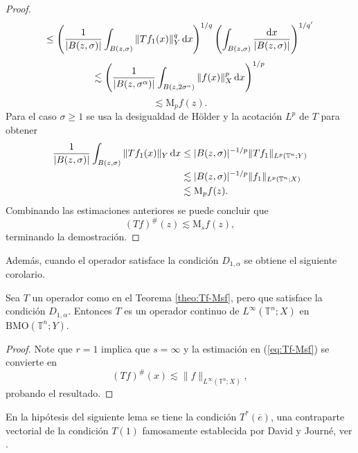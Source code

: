 \begin{proof}
\begin{equation*}
		\leq \left( 
		\frac{1}{|B(z,\sigma)|}\int_{B(z,\sigma)} \|Tf_1(x)\|^q_Y \mathop{}\!\mathrm{d} x 
		\right)^{1/q} \left( \int_{B(z,\sigma)} \frac{\mathop{}\!\mathrm{d} x}{|B(z,\sigma)|}  
		\right)^{1/q'}
	\end{equation*}
	\begin{equation*}
		\lesssim \left( \frac{1}{|B(z, \sigma^\alpha)|} \int_{B(z,2\sigma^\alpha)} \|f(x)\|_X^p \mathop{}\!\mathrm{d} x  \right)^{1/p} 
	\end{equation*}
	\begin{equation*}
		\lesssim \mathrm{M}_pf(z).
	\end{equation*}
	Para el caso $\sigma \geq 1$ se usa la desigualdad de H\"older y la acotación $L^p$ de $T$ para obtener
	\begin{align*}
		\frac{1}{|B(z,\sigma)|}\int_{B(z, \sigma)}\|Tf_1(x)\|_Y \mathop{}\!\mathrm{d} x   &\leq 
		|B(z,\sigma)|^{-1/p} \|Tf_1\|_{L^p(\mathbb{T}^n;Y)} \\
		 & \lesssim |B(z,\sigma)|^{-1/p} \|f_1\|_{L^p(\mathbb{T}^n;X)} \\
		 & \lesssim \mathrm{M}_pf(z).
	\end{align*}
	Combinando las estimaciones anteriores se puede concluir que 
	\begin{equation*}
		(Tf)^\#(z) \lesssim \mathrm{M}_sf(z),
	\end{equation*}
	terminando la demostración.
\end{proof}
Además, cuando el operador satisface la condición $D_{1,\alpha}$ se obtiene el siguiente corolario.
\begin{corollary}
	Sea $T$ un operador como en el Teorema \ref{theo:Tf-Msf}, pero que satisface la condición $D_{1,\alpha}$. Entonces $T$ es un operador continuo de $L^\infty(\mathbb{T}^n;X)$ en $\mathrm{BMO}(\mathbb{T}^n;Y)$.
	\label{cor:L-inf-BMO}
\end{corollary}
\begin{proof}
	Note que $r=1$ implica que $s=\infty$ y la estimación en (\ref{eq:Tf-Msf}) se convierte en
	\begin{equation*}
		(Tf)^\#(x) \lesssim \|f\|_{L^\infty(\mathbb{T}^n;X)},
	\end{equation*}
	probando el resultado.
\end{proof}
En la hipótesis del siguiente lema se tiene la condición $T^*(\overline{e})$, una contraparte vectorial de la condición $T(1)$ famosamente establecida por David y Journ\'e, ver \cite{david-journe}.
